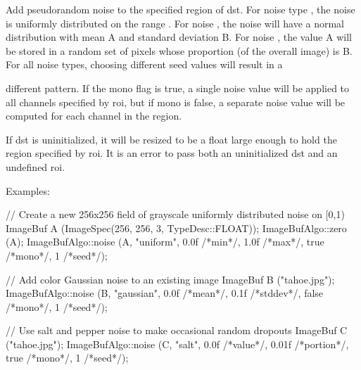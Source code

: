 
Add pseudorandom noise to the specified region of {\cf dst}. For noise
type , the noise is uniformly distributed on the
range {\cf [A,B)]}. For noise , the noise will have a
normal distribution with mean A and standard deviation B.
For noise , the value A will be stored in a random set of pixels
whose proportion (of the overall image) is B.
For all noise types, choosing different {\cf seed} values will result in a

different pattern. If the {\cf mono} flag is {\cf true}, a single noise
value will be applied to all channels specified by {\cf roi}, but if {\cf
mono} is {\cf false}, a separate noise value will be computed for each channel in
the region.

If {\cf dst} is uninitialized, it will be resized to be a {\cf float}
\ImageBuf large enough to hold the region specified by {\cf roi}. It is an
error to pass both an uninitialized {\cf dst} and an undefined {\cf roi}.

\smallskip
\noindent Examples:
\begin{code}
    // Create a new 256x256 field of grayscale uniformly distributed noise on [0,1)
    ImageBuf A (ImageSpec(256, 256, 3, TypeDesc::FLOAT));
    ImageBufAlgo::zero (A);
    ImageBufAlgo::noise (A, "uniform", 0.0f /*min*/, 1.0f /*max*/,
                         true /*mono*/, 1 /*seed*/);

    // Add color Gaussian noise to an existing image
    ImageBuf B ("tahoe.jpg");
    ImageBufAlgo::noise (B, "gaussian", 0.0f /*mean*/, 0.1f /*stddev*/,
                         false /*mono*/, 1 /*seed*/);

    // Use salt and pepper noise to make occasional random dropouts
    ImageBuf C ("tahoe.jpg");
    ImageBufAlgo::noise (C, "salt", 0.0f /*value*/, 0.01f /*portion*/,
                         true /*mono*/, 1 /*seed*/);
\end{code}

